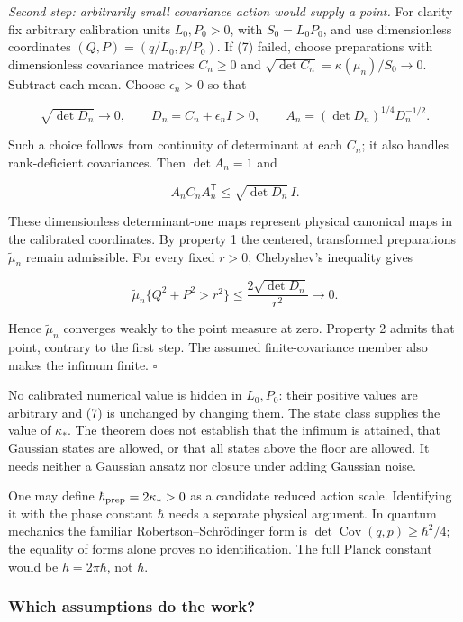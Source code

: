\documentclass[11pt,a4paper]{article}
\begin{document}
\emph{Second step: arbitrarily small covariance action would supply a
point.} For clarity fix arbitrary calibration units \(L_0,P_0>0\), with
\(S_0=L_0P_0\), and use dimensionless coordinates
\((Q,P)=(q/L_0,p/P_0)\). If (7) failed, choose preparations with
dimensionless covariance matrices \(C_n\ge0\) and
\(\sqrt{\det C_n}=\kappa(\mu_n)/S_0\to0\). Subtract each mean. Choose
\(\epsilon_n>0\) so that

\[
 \sqrt{\det D_n}\longrightarrow0,\qquad D_n=C_n+\epsilon_n I>0,
 \qquad A_n=(\det D_n)^{1/4}D_n^{-1/2}.
 \tag{9}
\]

Such a choice follows from continuity of determinant at each \(C_n\); it
also handles rank-deficient covariances. Then \(\det A_n=1\) and

\[
 A_nC_nA_n^{\mathsf T}\le\sqrt{\det D_n}\,I.
 \tag{10}
\]

These dimensionless determinant-one maps represent physical canonical
maps in the calibrated coordinates. By property 1 the centered,
transformed preparations \(\widetilde\mu_n\) remain admissible. For
every fixed \(r>0\), Chebyshev's inequality gives

\[
 \widetilde\mu_n\{Q^2+P^2>r^2\}
 \le\frac{2\sqrt{\det D_n}}{r^2}\longrightarrow0.
 \tag{11}
\]

Hence \(\widetilde\mu_n\) converges weakly to the point measure at zero.
Property 2 admits that point, contrary to the first step. The assumed
finite-covariance member also makes the infimum finite. \(\square\)

No calibrated numerical value is hidden in \(L_0,P_0\): their positive
values are arbitrary and (7) is unchanged by changing them. The state
class supplies the value of \(\kappa_*\). The theorem does not establish
that the infimum is attained, that Gaussian states are allowed, or that
all states above the floor are allowed. It needs neither a Gaussian
ansatz nor closure under adding Gaussian noise.

One may define \(\hbar_{\rm prep}=2\kappa_*>0\) as a candidate reduced
action scale. Identifying it with the phase constant \(\hbar\) needs a
separate physical argument. In quantum mechanics the familiar
Robertson--Schrödinger form is
\(\det\operatorname{Cov}(q,p)\ge\hbar^2/4\); the equality of forms alone
proves no identification. The full Planck constant would be
\(h=2\pi\hbar\), not \(\hbar\).

\hypertarget{which-assumptions-do-the-work}{%
\subsubsection{Which assumptions do the
work?}\label{which-assumptions-do-the-work}}
\end{document}
